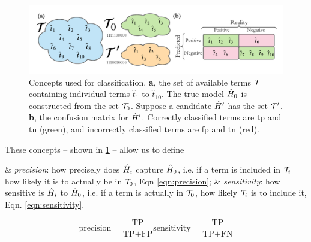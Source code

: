 \par 
\begin{figure}[t]
    \begin{center}
        \includegraphics[width=\textwidth]{theoretical_study/figures/classication_example.pdf}
    \end{center}
    \caption[Classification concepts]{
        Concepts used for classification. 
        \textbf{a}, the set of available terms $\mathcal{T}$ containing individual terms $\hat{t}_1$ to $\hat{t}_{10}$. 
        The \gls{true model} $\hat{H}_0$ is constructed from the set $\mathcal{T}_0$. 
        Suppose a candidate $\hat{H}^{\prime}$ has the set $\mathcal{T}^{\prime}$. 
        \textbf{b}, the confusion matrix for $\hat{H}^{\prime}$. Correctly classified terms are \acrlong{tp} and \acrlong{tn} (green), 
            and incorrectly classified terms are \acrlong{fp} and \acrlong{tn} (red). 
    }
    \label{fig:classification_eg}
\end{figure}
\noindent These concepts -- shown in \cref{fig:classification_eg} -- allow us to define 

\begin{easylist}
    & \emph{precision}: how precisely does $\hat{H}_i$ capture $\hat{H}_0$,
    i.e. if a term is included in ${ \mathcal{T}_i }$ how likely it is to actually be in ${ \mathcal{T}_0 }$, Eqn \ref{eqn:precision};
    & \emph{sensitivity}: how sensitive is $\hat{H}_i$ to $\hat{H}_0$, 
    i.e. if a term is actually in ${ \mathcal{T}_0 }$, how likely ${ \mathcal{T}_i }$ is to include it, Eqn. \ref{eqn:sensitivity}.
\end{easylist}

\begin{subequations}
    \begin{equation}
        \label{eqn:precision}
        \text{precision} = \frac{\textrm{TP}}{\textrm{TP} + \textrm{FP}}
    \end{equation}
       
    \begin{equation}
        \label{eqn:sensitivity}
        \text{sensitivity} = \frac{\textrm{TP}}{\textrm{TP} + \textrm{FN}}
    \end{equation}
\end{subequations}

